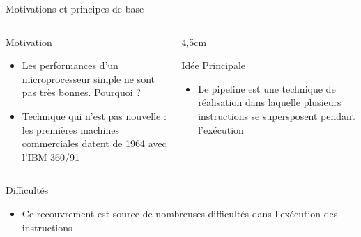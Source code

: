 %
\begin{Frame}{Motivations et principes de base}
  \begin{columns}[t]
    \begin{column}{7cm} %
      \begin{block}{Motivation}
        \begin{itemize}
        \item Les performances d'un microprocesseur simple ne sont pas
          très bonnes. Pourquoi ?
        \item Technique qui n'est pas nouvelle : les premières
          machines commerciales datent de 1964 avec l'IBM 360/91
        \end{itemize}
      \end{block} 
    \end{column}
    
    \begin{column}{4,5cm} %
      \begin{block}{Idée Principale}
        \begin{itemize}
        \item Le pipeline est une technique de réalisation dans
          laquelle plusieurs instructions se supersposent pendant
          l'exécution
        \end{itemize}
      \end{block}   
    \end{column}
  \end{columns}  

  \begin{block}{Difficultés}
       \begin{center}
 	\begin{itemize}
    \item Ce recouvrement est source de nombreuses difficultés dans
      l'exécution des instructions
        \end{itemize}
       \end{center}
      \end{block}   

\end{Frame}


